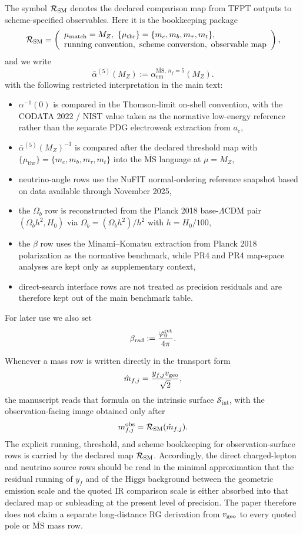 The symbol $\mathcal R_{\mathrm{SM}}$ denotes the declared comparison map from TFPT outputs to scheme-specified observables. Here it is the bookkeeping package
\[
\mathcal R_{\SM}
=
\left(
\begin{array}{l}
\mu_{\mathrm{match}}=M_Z,\ \{\mu_{\mathrm{thr}}\}=\{m_c,m_b,m_\tau,m_t\},\\
\text{running convention},\ \text{scheme conversion},\ \text{observable map}
\end{array}
\right),
\]
and we write
\[
\bar\alpha^{(5)}(M_Z):=\alpha_{\mathrm{em}}^{\overline{\mathrm{MS}},\,n_f=5}(M_Z).
\]
with the following restricted interpretation in the main text:
\begin{itemize}[leftmargin=1.5em, topsep=3pt, itemsep=2pt]
    \item $\alpha^{-1}(0)$ is compared in the Thomson-limit on-shell convention, with the CODATA 2022 / NIST value taken as the normative low-energy reference rather than the separate PDG electroweak extraction from $a_e$,
    \item $\bar\alpha^{(5)}(M_Z)^{-1}$ is compared after the declared threshold map with $\{\mu_{\mathrm{thr}}\}=\{m_c,m_b,m_\tau,m_t\}$ into the $\overline{\mathrm{MS}}$ language at $\mu=M_Z$,
    \item neutrino-angle rows use the NuFIT normal-ordering reference snapshot based on data available through November 2025,
    \item the $\Omega_b$ row is reconstructed from the Planck 2018 base-$\Lambda$CDM pair $(\Omega_b h^2,H_0)$ via $\Omega_b=(\Omega_b h^2)/h^2$ with $h=H_0/100$,
    \item the $\beta$ row uses the Minami--Komatsu extraction from Planck 2018 polarization as the normative benchmark, while PR4 and PR4 map-space analyses are kept only as supplementary context,
    \item direct-search interface rows are not treated as precision residuals and are therefore kept out of the main benchmark table.
\end{itemize}
For later use we also set
\[
\beta_{\mathrm{rad}}:=\frac{\varphi_0^{\mathrm{ret}}}{4\pi}.
\]

\begin{remark}
Whenever a mass row is written directly in the transport form
\[
\hat m_{f,j}=\frac{y_{f,j}v_{\mathrm{geo}}}{\sqrt2},
\]
the manuscript reads that formula on the intrinsic surface $\mathcal S_{\mathrm{int}}$, with the
observation-facing image obtained only after
\[
m_{f,j}^{\mathrm{obs}}=\mathcal R_{\mathrm{SM}}(\hat m_{f,j}).
\]
The explicit running, threshold, and scheme bookkeeping for observation-surface rows is carried by the declared map $\mathcal R_{\mathrm{SM}}$. Accordingly, the direct charged-lepton and neutrino source rows should be read in the minimal approximation that the residual running of $y_f$ and of the Higgs background between the geometric emission scale and the quoted IR comparison scale is either absorbed into that declared map or subleading at the present level of precision. The paper therefore does not claim a separate long-distance RG derivation from $v_{\mathrm{geo}}$ to every quoted pole or $\overline{\mathrm{MS}}$ mass row.
\end{remark}

